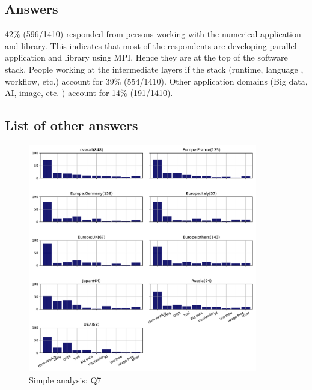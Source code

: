 
\subsection{Answers}


42\% (596/1410) responded from persons working with the
numerical application and library. This indicates that most of the respondents
are developing parallel application and library using MPI. Hence they are at the top of
the software stack. People working at the intermediate layers if the stack
(runtime, language , workflow, etc.) account for 39\% (554/1410). Other
application domains (Big data, AI, image, etc. ) account for 14\% (191/1410). 

\subsection{List of other answers}
\begin{itemize}

\end{itemize}

\begin{figure}[htb]
\begin{center}
\includegraphics[width=10cm]{../pdfs/Q7.pdf}
\caption{Simple analysis: Q7}
\label{fig:Q7}
\end{center}
\end{figure}
